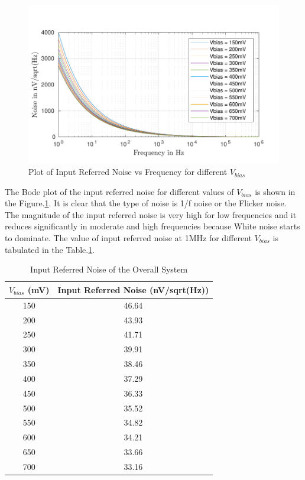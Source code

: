 \begin{figure} [H]
\centering
\includegraphics[scale=0.98]{Figures/Plots/Ov_Noise.pdf}
\caption{Plot of Input Referred Noise vs Frequency for different $V_{bias}$}
\label{fig:NOISE}
\end{figure}

The Bode plot of the input referred noise for different values of $V_{bias}$ is shown in the Figure.\ref{fig:NOISE}. It is clear that the type of noise is 1/f noise or the Flicker noise. The magnitude of the input referred noise is very high for low frequencies and it reduces significantly in moderate and high frequencies because White noise starts to dominate. The value of input referred noise at 1MHz for different $V_{bias}$ is tabulated in the Table.\ref{tab:NOISE}.

\begin{table} [H]
\centering
\begin{tabular}{@{}cc@{}}
\toprule
$V_{bias}$ (mV)			& Input Referred Noise (nV/sqrt(Hz))	\\ \midrule
150					& 46.64 \\
200					& 43.93 \\
250					& 41.71 \\
300					& 39.91 \\
350					& 38.46 \\
400					& 37.29 \\
450					& 36.33 \\
500					& 35.52 \\
550					& 34.82 \\
600					& 34.21 \\
650					& 33.66 \\
700 				& 33.16 \\
\bottomrule
\end{tabular}
\caption{Input Referred Noise of the Overall System}
\label{tab:NOISE}
\end{table}

